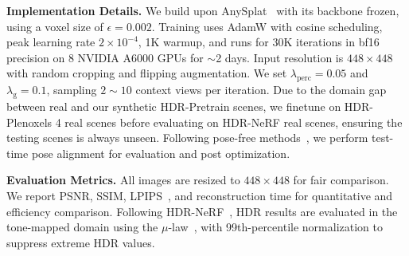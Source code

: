 \documentclass[runningheads]{llncs}
\begin{document}

\noindent\textbf{Implementation Details.}
We build upon AnySplat~\cite{jiang2025anysplat} with its backbone frozen, using a voxel size of $\epsilon{=}0.002$.
Training uses AdamW with cosine scheduling, peak learning rate $2{\times}10^{-4}$, 1K warmup, and runs for 30K iterations in bf16 precision on 8 NVIDIA A6000 GPUs for $\sim$2 days.
Input resolution is $448{\times}448$ with random cropping and flipping augmentation.
We set $\lambda_{\text{perc}}{=}0.05$ and $\lambda_{\text{g}}{=}0.1$, sampling $2{\sim}10$ context views per iteration.
Due to the domain gap between real and our synthetic HDR-Pretrain scenes, we finetune on HDR-Plenoxels 4 real scenes before evaluating on HDR-NeRF real scenes, ensuring the testing scenes is always unseen.
Following pose-free methods~\cite{ye2024no}, we perform test-time pose alignment for evaluation and post optimization.

\noindent\textbf{Evaluation Metrics.}
All images are resized to $448\times 448$ for fair comparison.
We report PSNR, SSIM, LPIPS~\cite{zhang2018unreasonable}, and reconstruction time for quantitative and efficiency comparison.
Following HDR-NeRF~\cite{huang2022hdr}, HDR results are evaluated in the tone-mapped domain using the $\mu$-law~\cite{kalantari2017deep}, with 99th-percentile normalization to suppress extreme HDR values.
\end{document}

